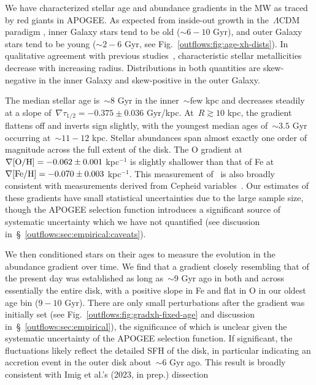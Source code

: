 We have characterized stellar age and abundance gradients in the MW as
traced by red giants in APOGEE.
As expected from inside-out growth in the~$\Lambda$CDM paradigm
\citep[e.g.,][]{White1991}, inner Galaxy stars tend to be old ($\sim$$6 - 10$
Gyr), and outer Galaxy stars tend to be young ($\sim$$2 - 6$ Gyr, see
Fig.~\ref{outflows:fig:age-xh-dists}).
In qualitative agreement with previous studies~\citep[e.g.,][]{Cheng2012,
Frinchaboy2013, Hayden2015, Myers2022}, characteristic stellar metallicities
decrease with increasing radius.
Distributions in both quantities are skew-negative in the inner Galaxy and
skew-positive in the outer Galaxy.
\par
The median stellar age is~$\sim$8 Gyr in the inner~$\sim$few kpc and decreases
steadily at a slope of~$\nabla\tau_{1/2} = -0.375 \pm 0.036$ Gyr/kpc.
At~$R \gtrsim 10$ kpc, the gradient flattens off and inverts sign slightly,
with the youngest median ages of~$\sim$$3.5$ Gyr occurring at~$\sim$$11 - 12$
kpc.
Stellar abundances span almost exactly one order of magnitude across the full
extent of the disk.
The O gradient at~$\nabla\text{[O/H]} = -0.062 \pm 0.001$ kpc$^{-1}$ is slightly
shallower than that of Fe at~$\nabla\text{[Fe/H]} = -0.070 \pm 0.003$ kpc$^{-1}$.
This measurement of~ is also broadly consistent with measurements
derived from Cepheid variables~\citep{Luck2011a, Luck2011b, Genovali2014,
Lemasle2018}.
Our estimates of these gradients have small statistical uncertainties due to
the large sample size, though the APOGEE selection function introduces a
significant source of systematic uncertainty which we have not quantified
(see discussion in~\S~\ref{outflows:sec:empirical:caveats}).
\par
We then conditioned stars on their ages to measure the evolution in the
abundance gradient over time.
We find that a gradient closely resembling that of the present day was
established as long as~$\sim$9 Gyr ago in both \space \oh \space and \space \feh
\space across essentially the entire disk, with a positive slope in Fe and
flat in O in our oldest age bin ($9 - 10$ Gyr).
There are only small perturbations after the gradient was initially set (see
Fig.~\ref{outflows:fig:gradxh-fixed-age} and discussion
in~\S~\ref{outflows:sec:empirical}), the significance of which is unclear given
the systematic uncertainty of the APOGEE selection function.
If significant, the fluctuations likely reflect the detailed SFH of the disk,
in particular indicating an accretion event in the outer disk about~$\sim$6 Gyr
ago.
This result is broadly consistent with Imig et al.'s (2023, in prep.) dissection
